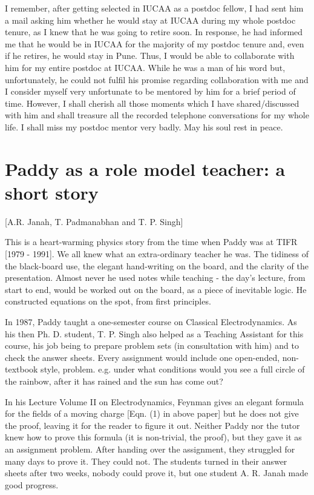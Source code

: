 \documentclass[prd, preprint, longbibliography, 11pt]{revtex4-1}
\begin{document}
     I remember, after getting selected in IUCAA as a postdoc fellow, I had sent him a mail asking him whether he would stay at IUCAA during my whole postdoc tenure, as I knew that he was going to retire soon.  In response, he had informed me that he would be in IUCAA for the majority of my postdoc tenure and, even if he retires, he would stay in Pune. Thus, I would be able to collaborate with him for my entire postdoc at IUCAA. While he was a man of his word but, unfortunately, he could not fulfil his promise regarding collaboration with me and I consider myself very unfortunate to be mentored by him for a brief period of time. However, I shall cherish all those moments which I have shared/discussed with him and shall treasure all the recorded telephone conversations for my whole life.  I shall miss my postdoc mentor very badly. May his soul rest in peace.




\section{Paddy as a role model teacher: a short story}
 [A.R. Janah, T. Padmanabhan and T. P. Singh]

\noindent This is a heart-warming physics story from the time when Paddy was at TIFR [1979 - 1991].
We all knew what an extra-ordinary teacher he was. The tidiness of the black-board use, the elegant hand-writing on the board, and the clarity of the presentation. Almost never he used notes while teaching - the day's lecture, from start to end, would be worked out on the board, as a piece of inevitable logic. He constructed equations on the spot, from first principles.

In 1987, Paddy taught a one-semester course on Classical Electrodynamics. As his then Ph. D. student, T. P. Singh also helped as a Teaching Assistant for this course, his job being to prepare problem sets (in consultation with him) and to check the answer sheets.
Every assignment would include one open-ended, non-textbook style, problem. e.g. under what conditions would you see a full circle of the rainbow, after it has rained and the sun has come out?

In his Lecture Volume II on Electrodynamics, Feynman gives an elegant formula for the fields of a moving charge [Eqn. (1) in above paper] but he does not give the proof, leaving it for the reader to figure it out. Neither Paddy nor the tutor knew how to prove this formula (it is non-trivial, the proof), but they gave it as an assignment problem.
After handing over the assignment, they struggled for many days to prove it. They could not. The students turned in their answer sheets after two weeks, nobody could prove it, but one student A. R. Janah made good progress.
\end{document}
